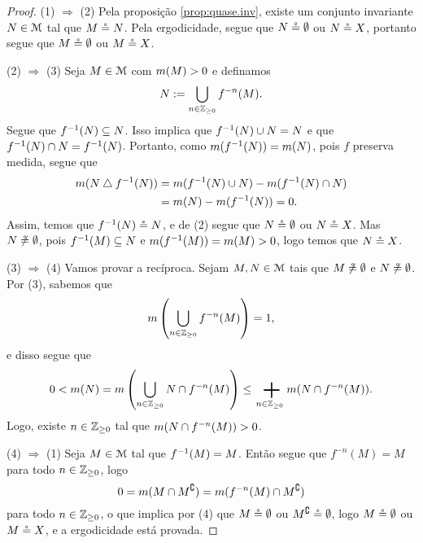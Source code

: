 \begin{proof}
(1) $\Rightarrow$ (2) Pela proposição \ref{prop:quase.inv}, existe um conjunto invariante $N \in \mathcal{M}$ tal que $M \circeq N$. Pela ergodicidade, segue que $N \circeq \emptyset$ ou $N \circeq X$, portanto segue que $M \circeq \emptyset$ ou $M \circeq X$.

(2) $\Rightarrow$ (3) Seja $M \in \mathcal{M}$ com $m(M)>0$ e definamos
	\begin{equation*}
	N := \bigcup_{n \in \mathbb{Z}_{\geq 0}} f^{-n}(M).
	\end{equation*}
Segue que $f^{-1}(N) \subseteq N$. Isso implica que $f^{-1}(N) \cup N= N$ e que $f^{-1}(N) \cap N = f^{-1}(N)$. Portanto, como $m(f^{-1}(N))=m(N)$, pois $f$ preserva medida, segue que
	\begin{align*}
	m(N \mathbin{\triangle} f^{-1}(N)) &= m(f^{-1}(N) \cup N) - m(f^{-1}(N) \cap N) \\
		&= m(N) - m(f^{-1}(N)) = 0.
	\end{align*}
Assim, temos que $f^{-1}(N) \circeq N$, e de (2) segue que $N \circeq \emptyset$ ou $N \circeq X$. Mas $N \not\circeq \emptyset$, pois $f^{-1}(M) \subseteq N$ e $m(f^{-1}(M))=m(M) > 0$, logo temos que $N \circeq X$.

(3) $\Rightarrow$ (4) Vamos provar a recíproca. Sejam $M,N \in \mathcal{M}$ tais que $M \not\circeq \emptyset$ e $N \not\circeq \emptyset$. Por (3), sabemos que
	\begin{equation*}
	m\left(\bigcup_{n \in \mathbb{Z}_{\geq 0}} f^{-n}(M)\right)=1,
	\end{equation*}
e disso segue que
	\begin{equation*}
	0 < \med(N) = \med\left(\bigcup_{n \in \Z_{\geq 0}} N \cap f^{-n}(M)\right) \leq \sum_{n \in \Z_{\geq 0}} \med(N \cap f^{-n}(M)).
	\end{equation*}
Logo, existe $n \in \mathbb{Z}_{\geq 0}$ tal que $m(N \cap f^{-n}(M))>0$.

(4) $\Rightarrow$ (1) Seja $M \in \mathcal{M}$ tal que $f^{-1}(M)=M$. Então segue que $f^{-n}(M)=M$ para todo $n \in \mathbb{Z}_{\geq 0}$, logo
	\begin{equation*}
	0=m(M \cap M^\complement)=m(f^{-n}(M) \cap M^\complement)
	\end{equation*}
para todo $n \in \mathbb{Z}_{\geq 0}$, o que implica por (4) que $M \circeq \emptyset$ ou $M^\complement \circeq \emptyset$, logo $M \circeq \emptyset$ ou $M \circeq X$, e a ergodicidade está provada.
\end{proof}

